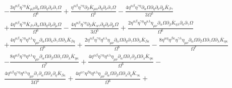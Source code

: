 \documentclass[10pt,letterpaper]{article}
\numberwithin{equation}{section}
\begin{document}
\begin{align}
&-  \frac{3 \eta^{\alpha \beta} \eta^{\gamma \eta} \overline{K}_{\mu \beta} \partial_{\alpha}\Omega \partial_{\eta}\partial_{\nu}\partial_{\gamma}\Omega}{\Omega^6} + \frac{\eta^{\alpha \beta} \eta^{\gamma \eta} \partial_{\beta}\overline{K}_{\mu \alpha} \partial_{\eta}\partial_{\nu}\partial_{\gamma}\Omega}{\Omega^5} -  \frac{4 \eta^{\alpha \beta} \eta^{\gamma \eta} \partial_{\alpha}\Omega \partial_{\eta}\partial_{\nu}\partial_{\mu}\overline{K}_{\beta \gamma}}{3 \Omega^5} \nonumber \\
&+ \frac{4 \eta^{\alpha \beta} \eta^{\gamma \eta} \overline{K}_{\beta \gamma} \partial_{\alpha}\Omega \partial_{\eta}\partial_{\nu}\partial_{\mu}\Omega}{\Omega^6} -  \frac{4 \eta^{\alpha \beta} \eta^{\gamma \eta} \partial_{\beta}\overline{K}_{\alpha \gamma} \partial_{\eta}\partial_{\nu}\partial_{\mu}\Omega}{3 \Omega^5} + \frac{2 \eta^{\alpha \beta} \eta^{\gamma \eta} \eta^{\kappa \lambda} \eta_{\mu \nu} \partial_{\alpha}\Omega \partial_{\beta}\overline{K}_{\eta \lambda} \partial_{\kappa}\partial_{\gamma}\Omega}{\Omega^6}\nonumber \\
& + \frac{4 \eta^{\alpha \beta} \eta^{\gamma \eta} \eta^{\kappa \lambda} \eta_{\mu \nu} \partial_{\alpha}\Omega \partial_{\kappa}\partial_{\gamma}\Omega \partial_{\lambda}\overline{K}_{\beta \eta}}{\Omega^6} + \frac{2 \eta^{\alpha \beta} \eta^{\gamma \eta} \eta^{\kappa \lambda} \eta_{\mu \nu} \partial_{\alpha}\Omega \partial_{\eta}\partial_{\gamma}\Omega \partial_{\lambda}\overline{K}_{\beta \kappa}}{\Omega^6} -  \frac{8 \eta^{\alpha \eta} \eta^{\beta \kappa} \eta^{\gamma \lambda} \eta_{\mu \nu} \partial_{\alpha}\Omega \partial_{\beta}\Omega \partial_{\gamma}\Omega \partial_{\lambda}\overline{K}_{\eta \kappa}}{\Omega^7} \nonumber \\
&-  \frac{8 \eta^{\alpha \beta} \eta^{\gamma \eta} \eta^{\kappa \lambda} \eta_{\mu \nu} \partial_{\alpha}\Omega \partial_{\beta}\Omega \partial_{\gamma}\Omega \partial_{\lambda}\overline{K}_{\eta \kappa}}{\Omega^7} + \frac{4 \eta^{\alpha \beta} \eta^{\gamma \eta} \eta^{\kappa \lambda} \eta_{\mu \nu} \partial_{\alpha}\Omega \partial_{\gamma}\partial_{\beta}\Omega \partial_{\lambda}\overline{K}_{\eta \kappa}}{\Omega^6} - \nonumber \\
& \frac{4 \eta^{\alpha \beta} \eta^{\gamma \eta} \eta^{\kappa \lambda} \eta_{\mu \nu} \partial_{\gamma}\partial_{\alpha}\Omega \partial_{\lambda}\partial_{\eta}\overline{K}_{\beta \kappa}}{3 \Omega^5} + \frac{4 \eta^{\alpha \gamma} \eta^{\beta \eta} \eta^{\kappa \lambda} \eta_{\mu \nu} \partial_{\alpha}\Omega \partial_{\beta}\Omega \partial_{\lambda}\partial_{\eta}\overline{K}_{\gamma \kappa}}{\Omega^6} + \nonumber \\

\end{align}
\end{document}
